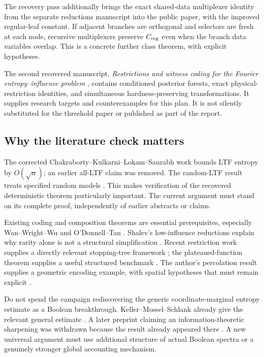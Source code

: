 \documentclass[11pt]{article}
\newcommand{\Creg}{C_{\rm reg}}\newcommand{\Rcost}{\mathcal R_f}
\begin{document}
The recovery pass additionally brings the exact shared-data multiplexer identity from the separate reductions manuscript into the public paper, with the improved regular-leaf constant. If adjacent branches are orthogonal and selectors are fresh at each node, recursive multiplexers preserve $\Creg$ even when the branch data variables overlap. This is a concrete further class theorem, with explicit hypotheses.

The second recovered manuscript, \emph{Restrictions and witness coding for the Fourier entropy--influence problem} \cite{Reductions}, contains conditioned posterior forests, exact physical-restriction identities, and simultaneous hardness-preserving transformations. It supplies research targets and counterexamples for this plan. It is not silently substituted for the threshold paper or published as part of the report.

\subsection{Why the literature check matters}

The corrected Chakraborty--Kulkarni--Lokam--Saurabh work bounds LTF entropy by $O(\sqrt n)$; an earlier all-LTF claim was removed. The random-LTF result treats specified random models \cite{CKLS,RandomLTF}. This makes verification of the recovered deterministic theorem particularly important. The current argument must stand on its complete proof, independently of earlier abstracts or claims.

Existing coding and composition theorems are essential prerequisites, especially Wan--Wright--Wu and O'Donnell--Tan \cite{WWW,ODT}. Shalev's low-influence reductions explain why rarity alone is not a structural simplification \cite{Shalev}. Recent restriction work supplies a directly relevant stopping-tree framework \cite{GMP}; the plateaued-function theorem supplies a useful structured benchmark \cite{Potapov}. The author's percolation result supplies a geometric encoding example, with spatial hypotheses that must remain explicit \cite{Percolation}.

Do not spend the campaign rediscovering the generic coordinate-marginal entropy estimate as a Boolean breakthrough. Keller--Mossel--Schlank already give the relevant general estimate \cite{KMS}. A later preprint claiming an information-theoretic sharpening was withdrawn because the result already appeared there \cite{Withdrawn}. A new universal argument must use additional structure of actual Boolean spectra or a genuinely stronger global accounting mechanism.
\end{document}
